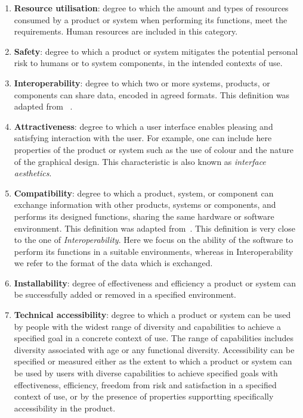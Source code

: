 \begin{enumerate}
    \item \textbf{Resource utilisation}: degree to which the amount and types of resources consumed by a product or system when performing its functions, meet the requirements. Human resources are included in this category.

    \item \textbf{Safety}: degree to which a product or system mitigates the potential personal risk to humans or to system components, in the intended contexts of use.

    \item \textbf{Interoperability}: degree to which two or more systems, products, or components can share data, encoded in agreed formats. This definition was adapted from ~\cite{iso_central_secretary_isoiecieee_2010}.

    \item \textbf{Attractiveness}: degree to which a user interface enables pleasing and satisfying interaction with the user. For example, one can include here properties of the product or system such as the use of colour and the nature of the graphical design. This characteristic is also known as \textit{interface aesthetics}.

    \item \textbf{Compatibility}: degree to which a product, system, or component can exchange information with other products, systems or components, and performs its designed functions, sharing the same hardware or software environment. This definition was adapted from~\cite{iso_central_secretary_isoiecieee_2010}. This definition is very close to the one of \textit{Interoperability}. Here we focus on the ability of the software to perform its functions in a suitable environments, whereas in Interoperability we refer to the format of the data which is exchanged.

    \item \textbf{Installability}: degree of effectiveness and efficiency a product or system can be successfully added or removed in a specified environment.

    \item \textbf{Technical accessibility}: degree to which a product or system can be used by people with the widest range of diversity and capabilities to achieve a specified goal in a concrete context of use. The range of capabilities includes diversity associated with age or any functional diversity. Accessibility can be specified or measured either as the extent to which a product or system can be used by users with diverse capabilities to achieve specified goals with effectiveness, efficiency, freedom from risk and satisfaction in a specified context of use, or by the presence of properties supportting specifically accessibility in the product.


\end{enumerate}
